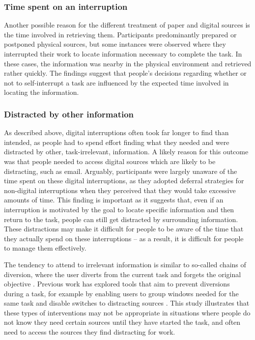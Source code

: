 \subsubsection{Time spent on an interruption}
Another possible reason for the different treatment of paper and digital sources is the time involved in retrieving them. Participants predominantly prepared or postponed physical sources, but some instances were observed where they interrupted their work to locate information necessary to complete the task. In these cases, the information was nearby in the physical environment and retrieved rather quickly. The findings suggest that people's decisions regarding whether or not to self-interrupt a task are influenced by the expected time involved in locating the information.

\subsubsection{Distracted by other information}
As described above, digital interruptions often took far longer to find than intended, as people had to spend effort finding what they needed and were distracted by other, task-irrelevant, information. A likely reason for this outcome was that people needed to access digital sources which are likely to be distracting, such as email. Arguably, participants were largely unaware of the time spent on these digital interruptions, as they adopted deferral strategies for non-digital interruptions when they perceived that they would take excessive amounts of time. This finding is important as it suggests that, even if an interruption is motivated by the goal to locate specific information and then return to the task, people can still get distracted by surrounding information. These distractions may make it difficult for people to be aware of the time that they actually spend on these interruptions – as a result, it is difficult for people to manage them effectively.

The tendency to attend to irrelevant information is similar to so-called chains of diversion, where the user diverts from the current task and forgets the original objective \citep{Hanrahan2015, Iqbal2007}. Previous work has explored tools that aim to prevent diversions during a task, for example by enabling users to group windows needed for the same task \citep{Smith2003} and disable switches to distracting sources \citep{Kim2017}. This study illustrates that these types of interventions may not be appropriate in situations where people do not know they need certain sources until they have started the task, and often need to access the sources they find distracting for work.

